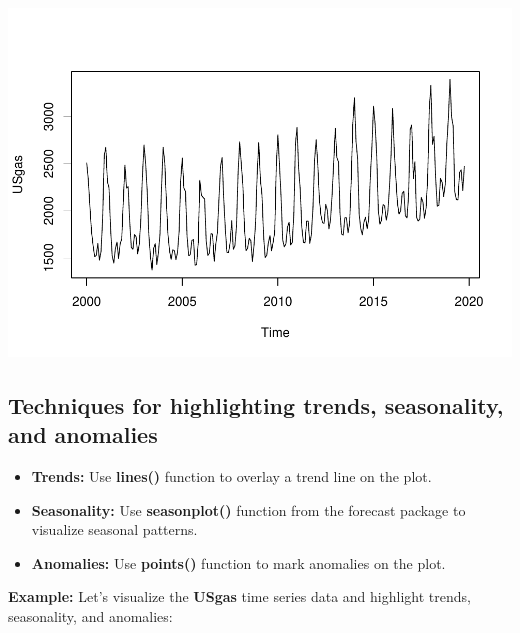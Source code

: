 \documentclass[
]{book}
\begin{document}
\includegraphics{_main_files/figure-latex/unnamed-chunk-61-1.pdf}

\subsection{Techniques for highlighting trends, seasonality, and anomalies}\label{techniques-for-highlighting-trends-seasonality-and-anomalies}

\begin{itemize}
\item
  \textbf{Trends:} Use \textbf{lines()} function to overlay a trend line on the plot.
\item
  \textbf{Seasonality:} Use \textbf{seasonplot()} function from the forecast package to visualize seasonal patterns.
\item
  \textbf{Anomalies:} Use \textbf{points()} function to mark anomalies on the plot.
\end{itemize}

\textbf{Example:} Let's visualize the \textbf{USgas} time series data and highlight trends, seasonality, and anomalies:
\end{document}
